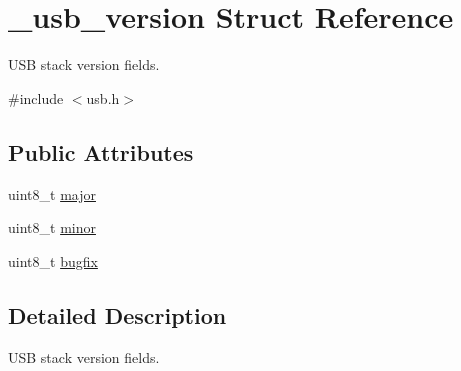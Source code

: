 \hypertarget{struct__usb__version}{\section{\-\_\-usb\-\_\-version Struct Reference}
\label{struct__usb__version}
}


U\-S\-B stack version fields.  




{\ttfamily \#include $<$usb.\-h$>$}

\subsection*{Public Attributes}
\begin{DoxyCompactItemize}
\item 
uint8\-\_\-t \hyperlink{struct__usb__version_ace9e449a494b60ecaa0cb11cc86b2ce5}{major}
\item 
uint8\-\_\-t \hyperlink{struct__usb__version_a296b41d0a6b23df94b88fba69c6caadf}{minor}
\item 
uint8\-\_\-t \hyperlink{struct__usb__version_a914f67fe68860253e895ff4817d4a528}{bugfix}
\end{DoxyCompactItemize}


\subsection{Detailed Description}
U\-S\-B stack version fields. 

